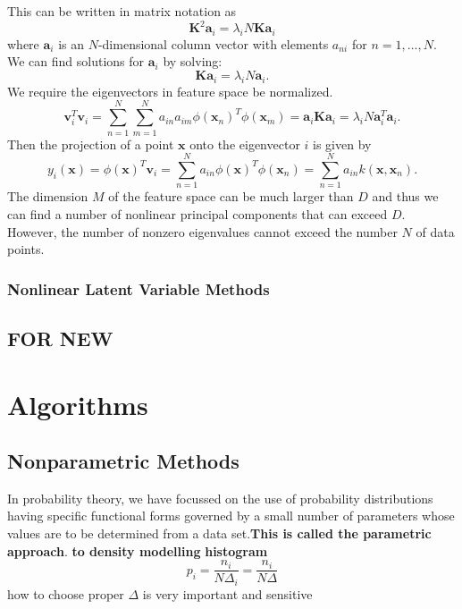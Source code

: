 \documentclass[a4paper]{book}
\newcommand{\mbf}{\mathbf}
\newcommand{\KK}{\mbf K}
\newcommand{\vv}{\mbf v}
\newcommand{\xx}{\mbf x}
\begin{document}
This can be written in matrix notation as
\begin{equation}\label{}
    \KK^2\mbf a_i=\lambda_iN\KK\mbf a_i
\end{equation}
where $\mbf a_i$ is an $N$-dimensional column vector with elements $a_{ni}$ for $n = 1, \dots, N$. We can find solutions for $\mbf a_i$ by solving:
\begin{equation}\label{}
    \KK\mbf a_i = \lambda_iN\mbf a_i.
\end{equation}
We require the eigenvectors in feature space be normalized.
\begin{equation}\label{}
  \vv_i^T\vv_i=\sum_{n=1}^{N}\sum_{m=1}^{N}a_{in}a_{im}\phi(\xx_n)^T\phi(\xx_m) =\mbf a_i\KK\mbf a_i = \lambda_iN\mbf a_i^T\mbf a_i.
\end{equation}
Then the projection of a point $\xx$ onto the eigenvector $i$ is given by
\begin{equation}\label{}
  y_i(\xx) = \phi(\xx)^T\vv_i=\sum_{n=1}^{N}a_{in}\phi(\xx)^T\phi(\xx_n) = \sum_{n=1}^{N}a_{in}k(\xx,\xx_n).
\end{equation}
The dimension $M$ of the feature space can be much larger than $D$ and thus we can find a number of nonlinear principal components that can exceed $D$. However, the number of nonzero eigenvalues cannot exceed the number $N$ of data points.

\subsection{Nonlinear Latent Variable Methods}

\section{FOR NEW}


\chapter{Algorithms}
\section{Nonparametric Methods}
In probability theory, we have  focussed on the use of probability distributions
having specific functional forms governed by a small number of parameters whose
values are to be determined from a data set.\textbf{This is called the parametric approach}.
\textbf{to density modelling}\newline
\textbf{histogram}
$$p_i = \frac{n_i}{N\Delta_i}=\frac{n_i}{N\Delta}$$
how to choose proper $\Delta$ is very important and sensitive
\end{document}
